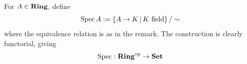 \begin{rmk}
\end{rmk}

\begin{dfn}
  
  For $A \in \mathbf{Ring}$, 
  define \[
    \operatorname{Spec} A := \left\{A \to K \,|\, K \text{ field}\right\} / \sim
  \]
  where the equivalence relation is as in the remark. 
  The construction is clearly functorial,
  giving \[
    \operatorname{Spec} : \mathbf{Ring}^{op} \to \mathbf{Set}
  \]
\end{dfn}

